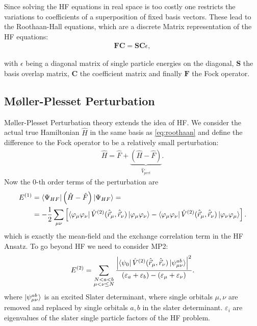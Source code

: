 Since solving the \ac{HF} equations in real space is too costly one restricts the variations to coefficients of a superposition of fixed basis vectors. These lead to the Roothaan-Hall equations, which are a discrete Matrix representation of the \ac{HF} equations:
\begin{align}
	\mathbf{F C}=\mathbf{S C} \epsilon,
	\label{eq:roothaan}
\end{align} 

with $\epsilon$ being a diagonal matrix of single particle energies on the diagonal, $\mathbf{S}$ the basis overlap matrix, $\mathbf{C}$ the coefficient matrix and finally $\mathbf{F}$ the Fock operator.
\subsection{Møller-Plesset Perturbation}
Møller-Plesset Perturbation theory extends the idea of \ac{HF}. We consider the actual true Hamiltonian  $\hat{H}$ in the same basis as \ref{eq:roothaan} and define the difference to the Fock operator to be a relatively small perturbation:
\begin{align}
	\hat{H}= \hat{F} + \underbrace{\left(\hat{H}-\hat{F}\right)}_{\hat{V}_{pert}}.
\end{align}
Now the $0$-th order terms of the perturbation are
\begin{align}
	E^{(1)}&=\bra{\Psi_{HF}}\left(\hat{H}-\hat{F}\right)\ket{\Psi_{HF}}=\\
	&=-\frac{1}{2}\sum_{\mu\nu}\left[\bra{\varphi_{\mu}\varphi_{\nu}}\hat{V}^{(2)}(\hat{\vec{r}}_\mu,\hat{\vec{r}}_\nu)\ket{\varphi_{\mu}\varphi_{\nu}}-\bra{\varphi_{\mu}\varphi_{\nu}}\hat{V}^{(2)}(\hat{\vec{r}}_\mu,\hat{\vec{r}}_\nu)\ket{\varphi_{\nu}\varphi_{\mu}}\right].
\end{align} 
which is exactly the mean-field and the exchange correlation term in the \ac{HF} Ansatz. To go beyond \ac{HF} we need to consider \ac{MP2}:
\begin{align}
	E^{(2)}=\sum_{\substack{N<a<b \\ \mu<\nu \leq N}} \frac{\left|\bra{\psi_0}\hat{V}^{(2)}(\hat{\vec{r}}_\mu,\hat{\vec{r}}_\nu)\ket{\psi_{\mu\nu}^{a b}}\right|^ 2}{\left(\varepsilon_a+\varepsilon_b\right)-\left(\varepsilon_\mu+\varepsilon_\nu\right)} .
\end{align} where $\ket{\psi_{\mu\nu}^{a b}}$ is an excited Slater determinant, where single orbitals $\mu, \nu$ are removed and replaced by single orbitals $a,b$ in the slater determinant. $\varepsilon_i$ are eigenvalues of the slater single particle factors of the \ac{HF} problem.
